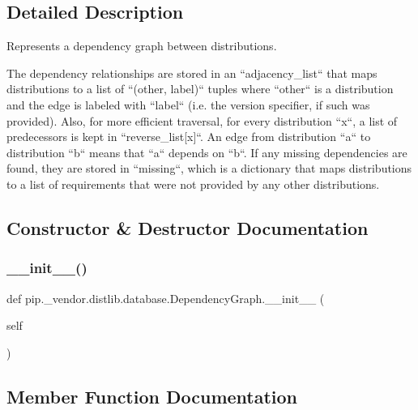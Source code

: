\subsection{Detailed Description}
\begin{DoxyVerb}Represents a dependency graph between distributions.

The dependency relationships are stored in an ``adjacency_list`` that maps
distributions to a list of ``(other, label)`` tuples where  ``other``
is a distribution and the edge is labeled with ``label`` (i.e. the version
specifier, if such was provided). Also, for more efficient traversal, for
every distribution ``x``, a list of predecessors is kept in
``reverse_list[x]``. An edge from distribution ``a`` to
distribution ``b`` means that ``a`` depends on ``b``. If any missing
dependencies are found, they are stored in ``missing``, which is a
dictionary that maps distributions to a list of requirements that were not
provided by any other distributions.
\end{DoxyVerb}
 

\subsection{Constructor \& Destructor Documentation}
\mbox{\label{classpip_1_1__vendor_1_1distlib_1_1database_1_1DependencyGraph_a3bfb8f60f329fbb0263f426f0199498c}} 
\subsubsection{\texorpdfstring{\+\_\+\+\_\+init\+\_\+\+\_\+()}{\_\_init\_\_()}}
{\footnotesize\ttfamily def pip.\+\_\+vendor.\+distlib.\+database.\+Dependency\+Graph.\+\_\+\+\_\+init\+\_\+\+\_\+ (\begin{DoxyParamCaption}\item[{}]{self }\end{DoxyParamCaption})}



\subsection{Member Function Documentation}
\mbox{\label{classpip_1_1__vendor_1_1distlib_1_1database_1_1DependencyGraph_a552032dc5099b46a72a7542fc28c4bd8}} 
